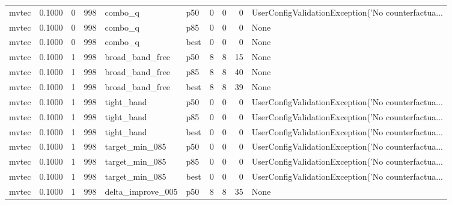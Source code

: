 \begin{tabular}{lrrrllrrrl}
   mvtec &    0.1000 &    0 &    998 &              combo\_q &    p50 &               0 &          0 &       0 & UserConfigValidationException('No counterfactua... \\
   mvtec &    0.1000 &    0 &    998 &              combo\_q &    p85 &               0 &          0 &       0 &                                               None \\
   mvtec &    0.1000 &    0 &    998 &              combo\_q &   best &               0 &          0 &       0 &                                               None \\
   mvtec &    0.1000 &    1 &    998 &      broad\_band\_free &    p50 &               8 &          8 &      15 &                                               None \\
   mvtec &    0.1000 &    1 &    998 &      broad\_band\_free &    p85 &               8 &          8 &      40 &                                               None \\
   mvtec &    0.1000 &    1 &    998 &      broad\_band\_free &   best &               8 &          8 &      39 &                                               None \\
   mvtec &    0.1000 &    1 &    998 &           tight\_band &    p50 &               0 &          0 &       0 & UserConfigValidationException('No counterfactua... \\
   mvtec &    0.1000 &    1 &    998 &           tight\_band &    p85 &               0 &          0 &       0 & UserConfigValidationException('No counterfactua... \\
   mvtec &    0.1000 &    1 &    998 &           tight\_band &   best &               0 &          0 &       0 & UserConfigValidationException('No counterfactua... \\
   mvtec &    0.1000 &    1 &    998 &       target\_min\_085 &    p50 &               0 &          0 &       0 & UserConfigValidationException('No counterfactua... \\
   mvtec &    0.1000 &    1 &    998 &       target\_min\_085 &    p85 &               0 &          0 &       0 & UserConfigValidationException('No counterfactua... \\
   mvtec &    0.1000 &    1 &    998 &       target\_min\_085 &   best &               0 &          0 &       0 & UserConfigValidationException('No counterfactua... \\
   mvtec &    0.1000 &    1 &    998 &    delta\_improve\_005 &    p50 &               8 &          8 &      35 &                                               None \\

\end{tabular}
